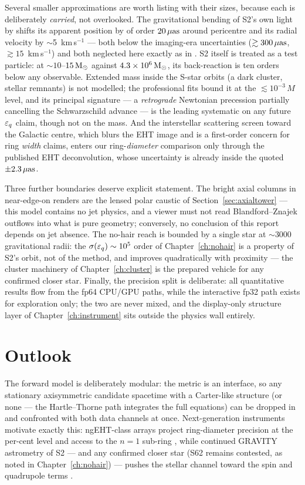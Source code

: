 Several smaller approximations are worth listing with their sizes,
because each is deliberately \emph{carried}, not overlooked. The
gravitational bending of S2's own light by \sgra{} shifts its apparent
position by of order $20\,\mu\mathrm{as}$ around pericentre and its radial
velocity by $\sim$5~km\,s$^{-1}$ — both below the imaging-era
uncertainties ($\gtrsim 300\,\mu\mathrm{as}$, $\gtrsim 15$~km\,s$^{-1}$) and
both neglected here exactly as in \citet{Gravity2018}. S2 itself is
treated as a test particle: at $\sim$$10$--$15\,\mathrm{M}_\odot$ against
$4.3\times10^6\,\mathrm{M}_\odot$, its back-reaction is ten orders below any
observable. Extended mass inside the S-star orbits (a dark cluster,
stellar remnants) is not modelled; the professional fits bound it at
the $\lesssim 10^{-3}\,M$ level, and its principal signature — a
\emph{retrograde} Newtonian precession partially cancelling the
Schwarzschild advance — is the leading systematic on any future
$\varepsilon_q$ claim, though not on the mass. And the interstellar
scattering screen toward the Galactic centre, which blurs the EHT
image and is a first-order concern for ring \emph{width} claims,
enters our ring-\emph{diameter} comparison only through the published
EHT deconvolution, whose uncertainty is already inside the quoted
$\pm2.3\,\mu\mathrm{as}$.

Three further boundaries deserve explicit statement. The bright axial
columns in near-edge-on renders are the lensed polar caustic of
Section~\ref{sec:axialtower} — this model contains no jet physics, and
a viewer must not read Blandford--Znajek outflows into what is pure
geometry; conversely, no conclusion of this report depends on jet
absence. The no-hair reach is bounded by a single star at
$\sim$3000 gravitational radii: the $\sigma(\varepsilon_q) \sim 10^{5}$ order
of Chapter~\ref{ch:nohair} is a property of S2's orbit, not of the
method, and improves quadratically with proximity — the cluster
machinery of Chapter~\ref{ch:cluster} is the prepared vehicle for any
confirmed closer star. Finally, the precision split is deliberate: all
quantitative results flow from the fp64 CPU/GPU paths, while the
interactive fp32 path exists for exploration only; the two are never
mixed, and the display-only structure layer of
Chapter~\ref{ch:instrument} sits outside the physics wall entirely.

\section{Outlook}
\label{sec:outlook}

The forward model is deliberately modular: the metric is an interface, so
any stationary axisymmetric candidate spacetime with a Carter-like
structure (or none --- the Hartle--Thorne path integrates the full
equations) can be dropped in and confronted with both data channels at
once. Next-generation instruments motivate exactly this: ngEHT-class
arrays project ring-diameter precision at the per-cent level and access to
the $n=1$ sub-ring \citep{Johnson2020}, while continued GRAVITY astrometry
of S2 --- and any confirmed closer star (S62 remains
\mbox{contested}, as noted
in Chapter~\ref{ch:nohair}) --- pushes the stellar channel toward the
spin and quadrupole terms \citep{Will2008,Psaltis2016}.

